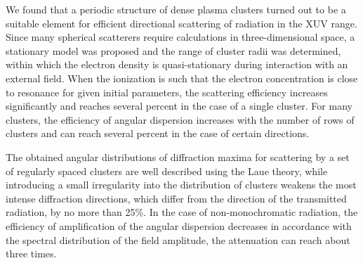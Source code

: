 We found that a periodic structure of dense plasma clusters turned out to be a suitable element for efficient directional scattering of radiation in the XUV range. Since many spherical scatterers require calculations in three-dimensional space, a stationary model was proposed and the range of cluster radii was determined, within which the electron density is quasi-stationary during interaction with an external field. When the ionization is such that the electron concentration is close to resonance for given initial parameters, the scattering efficiency increases significantly and reaches several percent in the case of a single cluster. For many clusters, the efficiency of angular dispersion increases with the number of rows of clusters and can reach several percent in the case of certain directions.

The obtained angular distributions of diffraction maxima for scattering by a set of regularly spaced clusters are well described using the Laue theory, while introducing a small irregularity into the distribution of clusters weakens the most intense diffraction directions, which differ from the direction of the transmitted radiation, by no more than 25\%. In the case of non-monochromatic radiation, the efficiency of amplification of the angular dispersion decreases in accordance with the spectral distribution of the field amplitude, the attenuation can reach about three times.